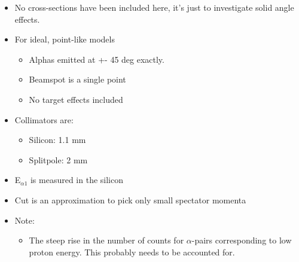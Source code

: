 \documentclass{article}
\begin{document}
\begin{itemize}
\item No cross-sections have been included here, it's just to
  investigate solid angle effects.
\item For ideal, point-like models
  \begin{itemize}
  \item Alphas emitted at +- 45 deg exactly.
  \item Beamspot is a single point
  \item No target effects included
  \end{itemize}
\item Collimators are:
  \begin{itemize}
  \item Silicon: 1.1 mm
  \item Splitpole: 2 mm
  \end{itemize}
\item E$_{\alpha1}$ is measured in the silicon
\item Cut is an approximation to pick only small spectator momenta
\item Note:
  \begin{itemize}
  \item The steep rise in the number of counts for $\alpha$-pairs
    corresponding to low proton energy. This probably needs to be
    accounted for.
  \end{itemize}

\end{itemize}
\end{document}
